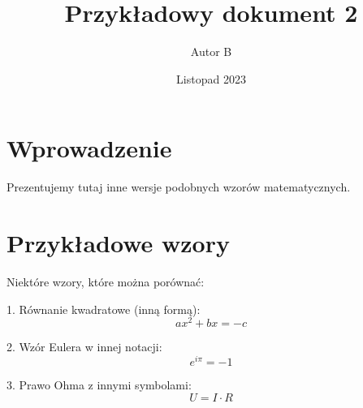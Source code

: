 \documentclass{article}
\title{Przykładowy dokument 2}
\author{Autor B}
\date{Listopad 2023}
\begin{document}
\maketitle

\section{Wprowadzenie}

Prezentujemy tutaj inne wersje podobnych wzorów matematycznych.

\section{Przykładowe wzory}

Niektóre wzory, które można porównać:

1. Równanie kwadratowe (inną formą):
\[ ax^2 + bx = -c \]

2. Wzór Eulera w innej notacji:
\[ e^{i\pi} = -1 \]

3. Prawo Ohma z innymi symbolami:
\[ U = I \cdot R \]
\end{document}
